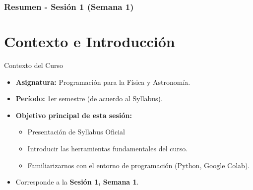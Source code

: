 \documentclass[10pt]{beamer}
\begin{document}
\myfront{}

\begin{frame}
  \titlepage
\end{frame}

\begin{frame}
  \frametitle{Resumen - Sesión 1 (Semana 1)}
  \tableofcontents
\end{frame}


\section{Contexto e Introducción}


\begin{frame}{Contexto del Curso}
  \begin{itemize}
    \item \textbf{Asignatura:} Programación para la Física y Astronomía.
    \item \textbf{Período:} 1er semestre (de acuerdo al Syllabus).
    \item \textbf{Objetivo principal de esta sesión:}
      \begin{itemize}
        \item Presentación de Syllabus Oficial
        \item Introducir las herramientas fundamentales del curso.
        \item Familiarizarnos con el entorno de programación (Python, Google Colab).
      \end{itemize}
    \item Corresponde a la \textbf{Sesión 1, Semana 1}.
  \end{itemize}
\end{frame}
\end{document}
